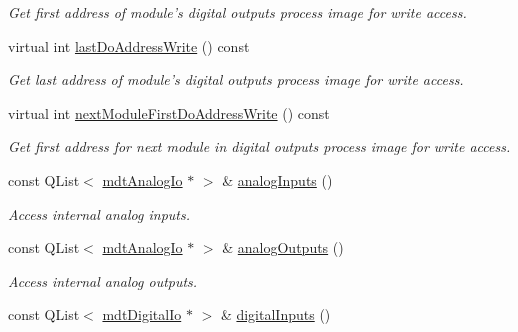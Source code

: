 \begin{DoxyCompactItemize}
\begin{DoxyCompactList}\small\item\em Get first address of module's digital outputs process image for write access. \end{DoxyCompactList}\item 
\hypertarget{classmdt_device_modbus_wago_module_a32cdbdcebb5b6d00dac2d1aaefff8fb6}{
virtual int \hyperlink{classmdt_device_modbus_wago_module_a32cdbdcebb5b6d00dac2d1aaefff8fb6}{lastDoAddressWrite} () const }
\label{classmdt_device_modbus_wago_module_a32cdbdcebb5b6d00dac2d1aaefff8fb6}

\begin{DoxyCompactList}\small\item\em Get last address of module's digital outputs process image for write access. \end{DoxyCompactList}\item 
\hypertarget{classmdt_device_modbus_wago_module_a2417c543a08a9804b0ec5b4dc9dfe4cd}{
virtual int \hyperlink{classmdt_device_modbus_wago_module_a2417c543a08a9804b0ec5b4dc9dfe4cd}{nextModuleFirstDoAddressWrite} () const }
\label{classmdt_device_modbus_wago_module_a2417c543a08a9804b0ec5b4dc9dfe4cd}

\begin{DoxyCompactList}\small\item\em Get first address for next module in digital outputs process image for write access. \end{DoxyCompactList}\item 
\hypertarget{classmdt_device_modbus_wago_module_a755946efd8ea4ee13d8f6fe4fb6ea05f}{
const QList$<$ \hyperlink{classmdt_analog_io}{mdtAnalogIo} $\ast$ $>$ \& \hyperlink{classmdt_device_modbus_wago_module_a755946efd8ea4ee13d8f6fe4fb6ea05f}{analogInputs} ()}
\label{classmdt_device_modbus_wago_module_a755946efd8ea4ee13d8f6fe4fb6ea05f}

\begin{DoxyCompactList}\small\item\em Access internal analog inputs. \end{DoxyCompactList}\item 
\hypertarget{classmdt_device_modbus_wago_module_a61ed3d50d5ad17324a6bf9d7c2cd1df5}{
const QList$<$ \hyperlink{classmdt_analog_io}{mdtAnalogIo} $\ast$ $>$ \& \hyperlink{classmdt_device_modbus_wago_module_a61ed3d50d5ad17324a6bf9d7c2cd1df5}{analogOutputs} ()}
\label{classmdt_device_modbus_wago_module_a61ed3d50d5ad17324a6bf9d7c2cd1df5}

\begin{DoxyCompactList}\small\item\em Access internal analog outputs. \end{DoxyCompactList}\item 
\hypertarget{classmdt_device_modbus_wago_module_ad9f9289c7f23f00c6d4d25b576a5c440}{
const QList$<$ \hyperlink{classmdt_digital_io}{mdtDigitalIo} $\ast$ $>$ \& \hyperlink{classmdt_device_modbus_wago_module_ad9f9289c7f23f00c6d4d25b576a5c440}{digitalInputs} ()}
\label{classmdt_device_modbus_wago_module_ad9f9289c7f23f00c6d4d25b576a5c440}


\end{DoxyCompactItemize}
